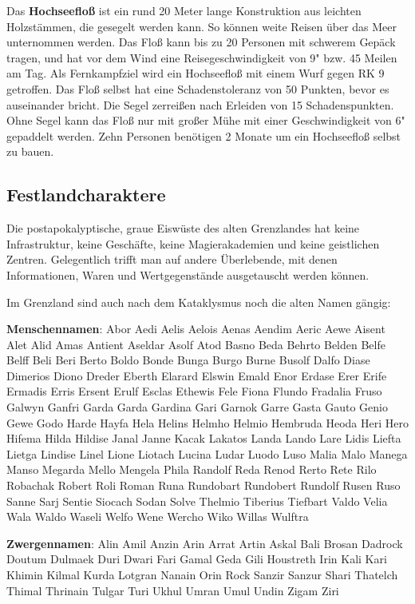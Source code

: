 \documentclass[11pt]{wbzine}
\begin{document}
\begin{multicols}{2}
Das \textbf{Hochseefloß} ist ein rund 20 Meter lange Konstruktion
aus leichten Holzstämmen, die gesegelt werden kann.  So können weite
Reisen über das Meer unternommen werden. Das Floß kann bis zu 
20 Personen mit schwerem Gepäck tragen, und hat vor dem Wind eine
Reisegeschwindigkeit von 9" bzw. 45 Meilen am Tag. Als Fernkampfziel
wird ein Hochseefloß mit einem Wurf gegen RK 9 getroffen. Das Floß
selbst hat eine Schadenstoleranz von 50 Punkten, bevor es
auseinander bricht. Die Segel zerreißen nach Erleiden von 15
Schadenspunkten. Ohne Segel kann das Floß nur mit großer Mühe mit
einer Geschwindigkeit von 6" gepaddelt werden. Zehn Personen
benötigen 2 Monate um ein Hochseefloß selbst zu bauen.

\subsection{Festlandcharaktere}

Die postapokalyptische, graue Eiswüste des alten Grenzlandes hat
keine Infrastruktur, keine Geschäfte, keine Magierakademien und
keine geistlichen Zentren. Gelegentlich trifft man auf andere
Überlebende, mit denen Informationen, Waren und Wertgegenstände 
ausgetauscht werden können. 

Im Grenzland sind auch nach dem Kataklysmus noch die alten Namen
gängig:

\textbf{Menschennamen}:
Abor
Aedi
Aelis
Aelois
Aenas
Aendim
Aeric
Aewe
Aisent
Alet
Alid
Amas
Antient
Aseldar
Asolf
Atod
Basno
Beda
Behrto
Belden
Belfe
Belff
Beli
Beri
Berto
Boldo
Bonde
Bunga
Burgo
Burne
Busolf
Dalfo
Diase
Dimerios
Diono
Dreder
Eberth
Elarard
Elswin
Emald
Enor
Erdase
Erer
Erife
Ermadis
Erris
Ersent
Erulf
Esclas
Ethewis
Fele
Fiona
Flundo
Fradalia
Fruso
Galwyn
Ganfri
Garda
Garda
Gardina
Gari
Garnok
Garre
Gasta
Gauto
Genio
Gewe
Godo
Harde
Hayfa
Hela
Helins
Helmho
Helmio
Hembruda
Heoda
Heri
Hero
Hifema
Hilda
Hildise
Janal
Janne
Kacak
Lakatos
Landa
Lando
Lare
Lidis
Liefta
Lietga
Lindise
Linel
Lione
Liotach
Lucina
Ludar
Luodo
Luso
Malia
Malo
Manega
Manso
Megarda
Mello
Mengela
Phila
Randolf
Reda
Renod
Rerto
Rete
Rilo
Robachak
Robert
Roli
Roman
Runa
Rundobart
Rundobert
Rundolf
Rusen
Ruso
Sanne
Sarj
Sentie
Siocach
Sodan
Solve
Thelmio
Tiberius
Tiefbart
Valdo
Velia
Wala
Waldo
Waseli
Welfo
Wene
Wercho
Wiko
Willas
Wulftra

\textbf{Zwergennamen}:
Alin
Amil
Anzin
Arin
Arrat
Artin
Askal
Bali
Brosan
Dadrock
Doutum
Dulmaek
Duri
Dwari
Fari
Gamal
Geda
Gili
Houstreth
Irin
Kali
Kari
Khimin
Kilmal
Kurda
Lotgran
Nanain
Orin
Rock
Sanzir
Sanzur
Shari
Thatelch
Thimal
Thrinain
Tulgar
Turi
Ukhul
Umran
Umul
Undin
Zigam
Ziri


\end{multicols}
\end{document}
